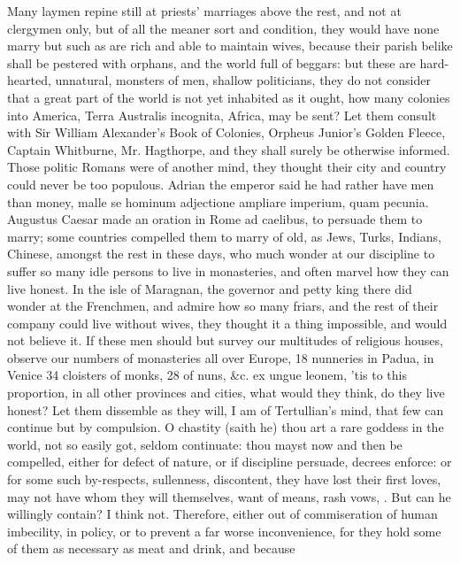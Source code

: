Many laymen repine still at priests' marriages above the rest, and not
at clergymen only, but of all the meaner sort and condition, they would
have none marry but such as are rich and able to maintain wives,
because their parish belike shall be pestered with orphans, and the
world full of beggars: but these are hard-hearted, unnatural,
monsters of men, shallow politicians, they do not consider that a
great part of the world is not yet inhabited as it ought, how many
colonies into America, Terra Australis incognita, Africa, may be sent?
Let them consult with Sir William Alexander's Book of Colonies, Orpheus
Junior's Golden Fleece, Captain Whitburne, Mr. Hagthorpe, \etc{} and they
shall surely be otherwise informed. Those politic Romans were of
another mind, they thought their city and country could never be too
populous. Adrian the emperor said he had rather have men than
money, malle se hominum adjectione ampliare imperium, quam pecunia.
Augustus Caesar made an oration in Rome ad caelibus, to persuade them
to marry; some countries compelled them to marry of old, as Jews,
Turks, Indians, Chinese, amongst the rest in these days, who much
wonder at our discipline to suffer so many idle persons to live in
monasteries, and often marvel how they can live honest. In the
isle of Maragnan, the governor and petty king there did wonder at the
Frenchmen, and admire how so many friars, and the rest of their company
could live without wives, they thought it a thing impossible, and would
not believe it. If these men should but survey our multitudes of
religious houses, observe our numbers of monasteries all over Europe,
18 nunneries in Padua, in Venice 34 cloisters of monks, 28 of nuns, \&c.
ex ungue leonem, 'tis to this proportion, in all other provinces and
cities, what would they think, do they live honest? Let them dissemble
as they will, I am of Tertullian's mind, that few can continue but by
compulsion. O chastity (saith he) thou art a rare goddess in the
world, not so easily got, seldom continuate: thou mayst now and then be
compelled, either for defect of nature, or if discipline persuade,
decrees enforce: or for some such by-respects, sullenness, discontent,
they have lost their first loves, may not have whom they will
themselves, want of means, rash vows, \etc{}. But can he willingly contain?
I think not. Therefore, either out of commiseration of human
imbecility, in policy, or to prevent a far worse inconvenience, for
they hold some of them as necessary as meat and drink, and because
